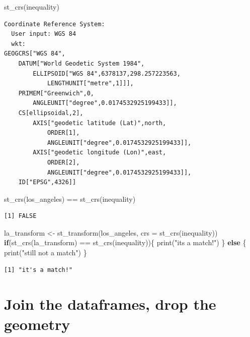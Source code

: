 \documentclass[
  letterpaper,
  DIV=11,
  numbers=noendperiod]{scrartcl}
\newenvironment{Shaded}{\begin{snugshade}}{\end{snugshade}}
\newcommand{\AttributeTok}[1]{\textcolor[rgb]{0.40,0.45,0.13}{#1}}
\newcommand{\ControlFlowTok}[1]{\textcolor[rgb]{0.00,0.23,0.31}{\textbf{#1}}}
\newcommand{\FunctionTok}[1]{\textcolor[rgb]{0.28,0.35,0.67}{#1}}
\newcommand{\NormalTok}[1]{\textcolor[rgb]{0.00,0.23,0.31}{#1}}
\newcommand{\OtherTok}[1]{\textcolor[rgb]{0.00,0.23,0.31}{#1}}
\newcommand{\SpecialCharTok}[1]{\textcolor[rgb]{0.37,0.37,0.37}{#1}}
\newcommand{\StringTok}[1]{\textcolor[rgb]{0.13,0.47,0.30}{#1}}
\begin{document}
\begin{Shaded}
\begin{Highlighting}[]
\FunctionTok{st\_crs}\NormalTok{(inequality)}
\end{Highlighting}
\end{Shaded}

\begin{verbatim}
Coordinate Reference System:
  User input: WGS 84 
  wkt:
GEOGCRS["WGS 84",
    DATUM["World Geodetic System 1984",
        ELLIPSOID["WGS 84",6378137,298.257223563,
            LENGTHUNIT["metre",1]]],
    PRIMEM["Greenwich",0,
        ANGLEUNIT["degree",0.0174532925199433]],
    CS[ellipsoidal,2],
        AXIS["geodetic latitude (Lat)",north,
            ORDER[1],
            ANGLEUNIT["degree",0.0174532925199433]],
        AXIS["geodetic longitude (Lon)",east,
            ORDER[2],
            ANGLEUNIT["degree",0.0174532925199433]],
    ID["EPSG",4326]]
\end{verbatim}

\begin{Shaded}
\begin{Highlighting}[]
\FunctionTok{st\_crs}\NormalTok{(los\_angeles) }\SpecialCharTok{==} \FunctionTok{st\_crs}\NormalTok{(inequality)}
\end{Highlighting}
\end{Shaded}

\begin{verbatim}
[1] FALSE
\end{verbatim}

\begin{Shaded}
\begin{Highlighting}[]
\NormalTok{la\_transform }\OtherTok{\textless{}{-}} \FunctionTok{st\_transform}\NormalTok{(los\_angeles, }\AttributeTok{crs =} \FunctionTok{st\_crs}\NormalTok{(inequality))}
\ControlFlowTok{if}\NormalTok{(}\FunctionTok{st\_crs}\NormalTok{(la\_transform) }\SpecialCharTok{==} \FunctionTok{st\_crs}\NormalTok{(inequality))\{}
  \FunctionTok{print}\NormalTok{(}\StringTok{"it\textquotesingle{}s a match!"}\NormalTok{)}
\NormalTok{\} }\ControlFlowTok{else}\NormalTok{ \{}
  \FunctionTok{print}\NormalTok{(}\StringTok{"still not a match"}\NormalTok{)}
\NormalTok{\}}
\end{Highlighting}
\end{Shaded}

\begin{verbatim}
[1] "it's a match!"
\end{verbatim}

\section{Join the dataframes, drop the
geometry}\label{join-the-dataframes-drop-the-geometry}
\end{document}
